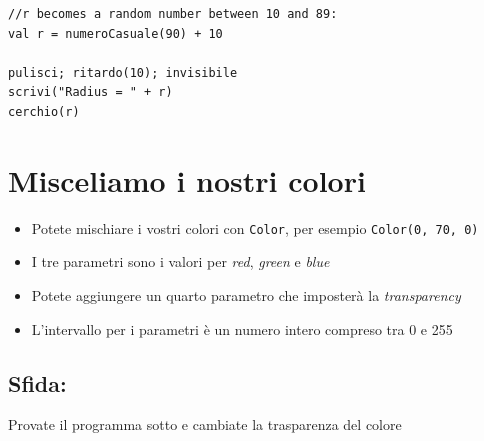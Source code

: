   

\begin{lstlisting}[basicstyle={\ttfamily\fontsize{20}{24}\selectfont},numbers=none]
//r becomes a random number between 10 and 89:
val r = numeroCasuale(90) + 10   

pulisci; ritardo(10); invisibile
scrivi("Radius = " + r)
cerchio(r)
\end{lstlisting}
        
\chapter{Misceliamo i nostri colori}

\begin{itemize}

\item {Potete mischiare i vostri colori con \lstinline{Color}, per esempio \lstinline{Color(0, 70, 0)}}
\item {I tre parametri sono i valori per {\it red}, {\it green} e {\it blue}}
\item {Potete aggiungere un quarto parametro che imposterà la {\it transparency}}
\item {L'intervallo per i parametri è un numero intero compreso tra 0 e 255}

\end{itemize}


\section*{\color{BrickRed}Sfida:}
Provate il programma sotto e cambiate la trasparenza del colore

